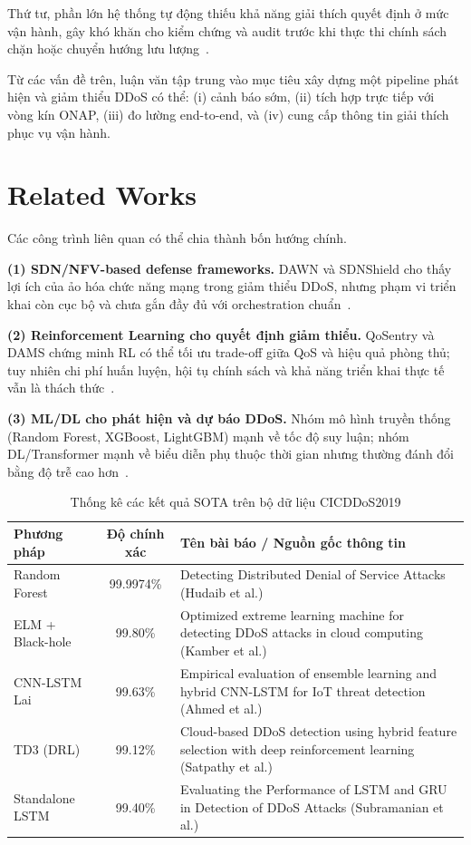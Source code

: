 Thứ tư, phần lớn hệ thống tự động thiếu khả năng giải thích quyết định ở mức vận hành, gây khó khăn cho kiểm chứng và audit trước khi thực thi chính sách chặn hoặc chuyển hướng lưu lượng~\cite{lundberg2017unified}.

Từ các vấn đề trên, luận văn tập trung vào mục tiêu xây dựng một pipeline phát hiện và giảm thiểu DDoS có thể: (i) cảnh báo sớm, (ii) tích hợp trực tiếp với vòng kín ONAP, (iii) đo lường end-to-end, và (iv) cung cấp thông tin giải thích phục vụ vận hành.

\section{Related Works}
\label{sec:related_works}

Các công trình liên quan có thể chia thành bốn hướng chính.

\textbf{(1) SDN/NFV-based defense frameworks.} DAWN và SDNShield cho thấy lợi ích của ảo hóa chức năng mạng trong giảm thiểu DDoS, nhưng phạm vi triển khai còn cục bộ và chưa gắn đầy đủ với orchestration chuẩn~\cite{dawn2025,sdnshield2021}.

\textbf{(2) Reinforcement Learning cho quyết định giảm thiểu.} QoSentry và DAMS chứng minh RL có thể tối ưu trade-off giữa QoS và hiệu quả phòng thủ; tuy nhiên chi phí huấn luyện, hội tụ chính sách và khả năng triển khai thực tế vẫn là thách thức~\cite{jnsm2025qosentry,khozam2024}.

\textbf{(3) ML/DL cho phát hiện và dự báo DDoS.} Nhóm mô hình truyền thống (Random Forest, XGBoost, LightGBM) mạnh về tốc độ suy luận; nhóm DL/Transformer mạnh về biểu diễn phụ thuộc thời gian nhưng thường đánh đổi bằng độ trễ cao hơn~\cite{mdpi2025transformer}.
\begin{table}[h]
\centering
\caption{Thống kê các kết quả SOTA trên bộ dữ liệu CICDDoS2019}
\label{tab:cicddos2019_sources}
\begin{tabular}{|l|c|p{8cm}|}
\hline
\textbf{Phương pháp} & \textbf{Độ chính xác} & \textbf{Tên bài báo / Nguồn gốc thông tin} \\ \hline
Random Forest & 99.9974\% & Detecting Distributed Denial of Service Attacks (Hudaib et al.) \\ \hline
ELM + Black-hole & 99.80\% & Optimized extreme learning machine for detecting DDoS attacks in cloud computing (Kamber et al.) \\ \hline
CNN-LSTM Lai & 99.63\% & Empirical evaluation of ensemble learning and hybrid CNN-LSTM for IoT threat detection (Ahmed et al.) \\ \hline
TD3 (DRL) & 99.12\% & Cloud-based DDoS detection using hybrid feature selection with deep reinforcement learning (Satpathy et al.) \\ \hline
Standalone LSTM & 99.40\% & Evaluating the Performance of LSTM and GRU in Detection of DDoS Attacks (Subramanian et al.) \\ \hline

\end{tabular}
\end{table}

